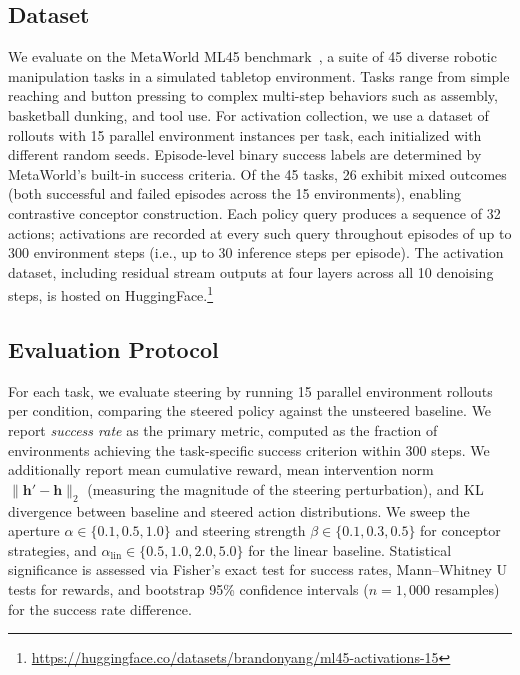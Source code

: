 \subsection{Dataset}
\label{sec:dataset}

We evaluate on the MetaWorld ML45 benchmark~\citep{yu2020meta}, a suite of 45 diverse robotic manipulation tasks in a simulated tabletop environment. Tasks range from simple reaching and button pressing to complex multi-step behaviors such as assembly, basketball dunking, and tool use. For activation collection, we use a dataset of rollouts with 15 parallel environment instances per task, each initialized with different random seeds. Episode-level binary success labels are determined by MetaWorld's built-in success criteria. Of the 45 tasks, 26 exhibit mixed outcomes (both successful and failed episodes across the 15 environments), enabling contrastive conceptor construction. Each policy query produces a sequence of 32 actions; activations are recorded at every such query throughout episodes of up to 300 environment steps (i.e., up to 30 inference steps per episode). The activation dataset, including residual stream outputs at four layers across all 10 denoising steps, is hosted on HuggingFace.\footnote{\url{https://huggingface.co/datasets/brandonyang/ml45-activations-15}}


\subsection{Evaluation Protocol}
\label{sec:eval_protocol}

For each task, we evaluate steering by running 15 parallel environment rollouts per condition, comparing the steered policy against the unsteered baseline. We report \emph{success rate} as the primary metric, computed as the fraction of environments achieving the task-specific success criterion within 300 steps. We additionally report mean cumulative reward, mean intervention norm $\|\mathbf{h}' - \mathbf{h}\|_2$ (measuring the magnitude of the steering perturbation), and KL divergence between baseline and steered action distributions. We sweep the aperture $\alpha \in \{0.1, 0.5, 1.0\}$ and steering strength $\beta \in \{0.1, 0.3, 0.5\}$ for conceptor strategies, and $\alpha_{\text{lin}} \in \{0.5, 1.0, 2.0, 5.0\}$ for the linear baseline. Statistical significance is assessed via Fisher's exact test for success rates, Mann--Whitney U tests for rewards, and bootstrap 95\% confidence intervals ($n=1{,}000$ resamples) for the success rate difference.


